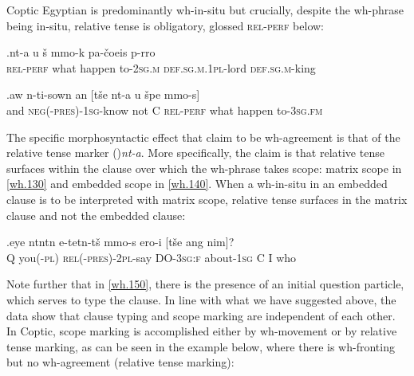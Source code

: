 \documentclass[charis]{glossa}
\begin{document}
Coptic Egyptian is predominantly wh-in-situ but crucially, despite the wh-phrase being in-situ, relative tense is obligatory, glossed \textsc{rel-perf} below:

\exg.\label{wh.130}{\textschwa}nt-a u \v{s}{\textopeno} {\textschwa}mmo-k pa-\v{c}oeis p-{\textschwa}rro\\
   \textsc{rel-perf} what happen to-\textsc{2sg.m} \textsc{def.sg.m.1pl}-lord \textsc{def.sg.m}-king\\

\exg.\label{wh.140}aw{\textopeno} n-ti-sown an [t\v{s}e nt-a u \v{s}{\textopeno}pe {\textschwa}mmo-s]\\
   and \textsc{neg(-pres)-1sg}-know not C \textsc{rel-perf} what happen to-\textsc{3sg.fm}\\

The specific morphosyntactic effect that \cite{rlc:2006} claim to be wh-agreement is that of the relative tense marker (\textschwa)\textit{nt-a}. More specifically, the claim is that relative tense surfaces within the clause over which the wh-phrase takes scope: matrix scope in \ref{wh.130} and embedded scope in \ref{wh.140}. When a wh-in-situ in an embedded clause is to be interpreted with matrix scope, relative tense surfaces in the matrix clause and not the embedded clause:

\exg.\label{wh.150}eye {\textschwa}nt{\textopeno}nt{\textschwa}n e-tet{\textschwa}n-t\v{s}{\textopeno} {\textschwa}mmo-s ero-i [t\v{s}e ang nim]?\\
   Q you(\textsc{-pl}) \textsc{rel(-pres)-2pl}-say DO-\textsc{3sg:f} about-\textsc{1sg} C I who\\

Note further that in \ref{wh.150}, there is the presence of an initial question particle, which serves to type the clause. In line with what we have suggested above, the data show that clause typing and scope marking are independent of each other. In Coptic, scope marking is accomplished either by wh-movement or by relative tense marking, as can be seen in the example below, where there is wh-fronting but no wh-agreement (relative tense marking):

%
%
\end{document}
